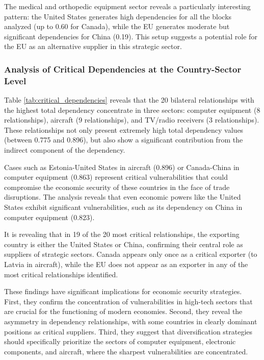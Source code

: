 \documentclass[final,1p,times,authoryear]{elsarticle}
\begin{document}
The medical and orthopedic equipment sector reveals a particularly interesting pattern: the United States generates high dependencies for all the blocks analyzed (up to 0.60 for Canada), while the EU generates moderate but significant dependencies for China (0.19). This setup suggests a potential role for the EU as an alternative supplier in this strategic sector.

\subsubsection{Analysis of Critical Dependencies at the Country-Sector Level}

Table \ref{tab:critical_dependencies} reveals that the 20 bilateral relationships with the highest total dependency concentrate in three sectors: computer equipment (8 relationships), aircraft (9 relationships), and TV/radio receivers (3 relationships). These relationships not only present extremely high total dependency values (between 0.775 and 0.896), but also show a significant contribution from the indirect component of the dependency.

\begin{table}[t]
\centering
\caption{The 20 Trade Relationships with the Highest Total Dependency Between Selected Countries}

\end{table}

Cases such as Estonia-United States in aircraft (0.896) or Canada-China in computer equipment (0.863) represent critical vulnerabilities that could compromise the economic security of these countries in the face of trade disruptions. The analysis reveals that even economic powers like the United States exhibit significant vulnerabilities, such as its dependency on China in computer equipment (0.823).

It is revealing that in 19 of the 20 most critical relationships, the exporting country is either the United States or China, confirming their central role as suppliers of strategic sectors. Canada appears only once as a critical exporter (to Latvia in aircraft), while the EU does not appear as an exporter in any of the most critical relationships identified.

These findings have significant implications for economic security strategies. First, they confirm the concentration of vulnerabilities in high-tech sectors that are crucial for the functioning of modern economies. Second, they reveal the asymmetry in dependency relationships, with some countries in clearly dominant positions as critical suppliers. Third, they suggest that diversification strategies should specifically prioritize the sectors of computer equipment, electronic components, and aircraft, where the sharpest vulnerabilities are concentrated.
\end{document}
